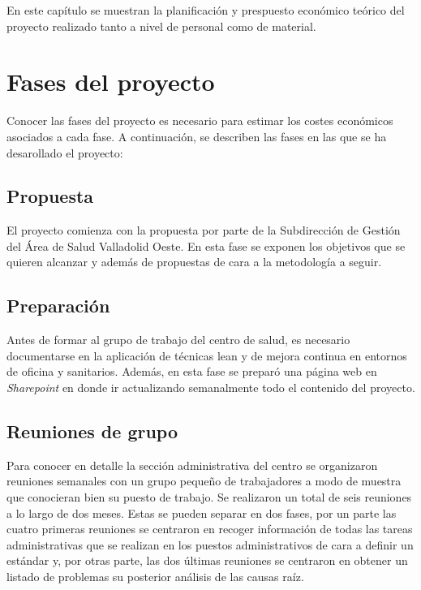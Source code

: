 En este capítulo se muestran la planificación y prespuesto económico teórico del proyecto realizado tanto a nivel de personal como de material.

\section{Fases del proyecto}

Conocer las fases del proyecto es necesario para estimar los costes económicos asociados a cada fase.
A continuación, se describen las fases en las que se ha desarollado el proyecto:

\subsection{Propuesta}

El proyecto comienza con la propuesta por parte de la Subdirección de Gestión del Área de Salud Valladolid Oeste. En esta fase se exponen los objetivos que se quieren alcanzar y además de propuestas de cara a la metodología a seguir.

\subsection{Preparación}

Antes de formar al grupo de trabajo del centro de salud, es necesario documentarse en la aplicación de técnicas lean y de mejora continua en entornos de oficina y sanitarios. Además, en esta fase se preparó una página web en \textit{Sharepoint} en donde ir actualizando semanalmente todo el contenido del proyecto.

\subsection{Reuniones de grupo}

Para conocer en detalle la sección administrativa del centro se organizaron reuniones semanales con un grupo pequeño de trabajadores a modo de muestra que conocieran bien su puesto de trabajo.
Se realizaron un total de seis reuniones a lo largo de dos meses.
Estas se pueden separar en dos fases, por un parte las cuatro primeras reuniones se centraron en recoger información de todas las tareas administrativas que se realizan en los puestos administrativos de cara a definir un estándar y, por otras parte, las dos últimas reuniones se centraron en obtener un listado de problemas su posterior análisis de las causas raíz.

